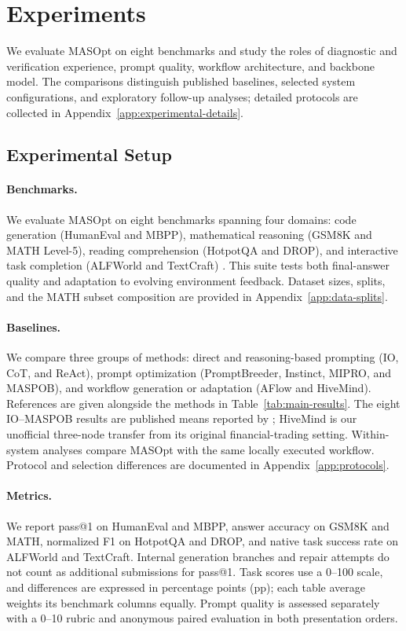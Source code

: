 \section{Experiments}
\label{sec:experiments}

We evaluate MASOpt on eight benchmarks and study the roles of diagnostic and verification experience, prompt quality, workflow architecture, and backbone model. The comparisons distinguish published baselines, selected system configurations, and exploratory follow-up analyses; detailed protocols are collected in Appendix~\ref{app:experimental-details}.

\subsection{Experimental Setup}
\label{sec:experimental-setup}

\paragraph{Benchmarks.}
We evaluate MASOpt on eight benchmarks spanning four domains: code generation (HumanEval and MBPP), mathematical reasoning (GSM8K and MATH Level-5), reading comprehension (HotpotQA and DROP), and interactive task completion (ALFWorld and TextCraft) \citep{chen2021humaneval,austin2021mbpp,cobbe2021gsm8k,hendrycks2021math,yang2018hotpotqa,dua2019drop,shridhar2020alfworld,prasad2024textcraft}. This suite tests both final-answer quality and adaptation to evolving environment feedback. Dataset sizes, splits, and the MATH subset composition are provided in Appendix~\ref{app:data-splits}.

\paragraph{Baselines.}
We compare three groups of methods: direct and reasoning-based prompting (IO, CoT, and ReAct), prompt optimization (PromptBreeder, Instinct, MIPRO, and MASPOB), and workflow generation or adaptation (AFlow and HiveMind). References are given alongside the methods in Table~\ref{tab:main-results}. The eight IO--MASPOB results are published means reported by \citet{hong2026maspob}; HiveMind is our unofficial three-node transfer from its original financial-trading setting. Within-system analyses compare MASOpt with the same locally executed workflow. Protocol and selection differences are documented in Appendix~\ref{app:protocols}.

\paragraph{Metrics.}
We report pass@1 on HumanEval and MBPP, answer accuracy on GSM8K and MATH, normalized F1 on HotpotQA and DROP, and native task success rate on ALFWorld and TextCraft. Internal generation branches and repair attempts do not count as additional submissions for pass@1. Task scores use a 0--100 scale, and differences are expressed in percentage points (pp); each table average weights its benchmark columns equally. Prompt quality is assessed separately with a 0--10 rubric and anonymous paired evaluation in both presentation orders.


